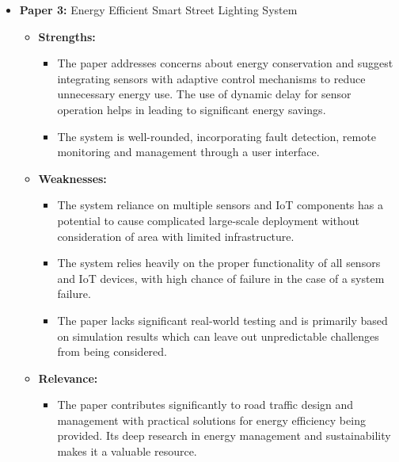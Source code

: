 \documentclass[12pt,a4paper]{article}
\begin{document}
\begin{itemize}
        \item \textbf{Paper 3:} Energy Efficient Smart Street Lighting System
        
    \begin{itemize}
    
        \item \textbf{Strengths:}
        
                \begin{itemize}
            \item The paper addresses concerns about energy conservation and suggest integrating sensors with adaptive control mechanisms to reduce unnecessary energy use. The use of dynamic delay for sensor operation helps in leading to significant energy savings. 
            \item The system is well-rounded, incorporating fault detection, remote monitoring and management through a user interface. 
        \end{itemize}
        
        \item \textbf{Weaknesses:}
        
                \begin{itemize}
            \item The system reliance on multiple sensors and IoT components has a potential to cause complicated large-scale deployment without consideration of area with limited infrastructure. 
            \item The system relies heavily on the proper functionality of all sensors and IoT devices, with high chance of failure in the case of a system failure. 
            \item The paper lacks significant real-world testing and is primarily based on simulation results which can leave out unpredictable challenges from being considered. 
        \end{itemize}
        
        \item \textbf{Relevance: } 
        
                \begin{itemize}
            \item The paper contributes significantly to road traffic design and management with practical solutions for energy efficiency being provided. Its deep research in energy management and sustainability makes it a valuable resource.  
        \end{itemize}
    \end{itemize}
    

\end{itemize}
\end{document}
